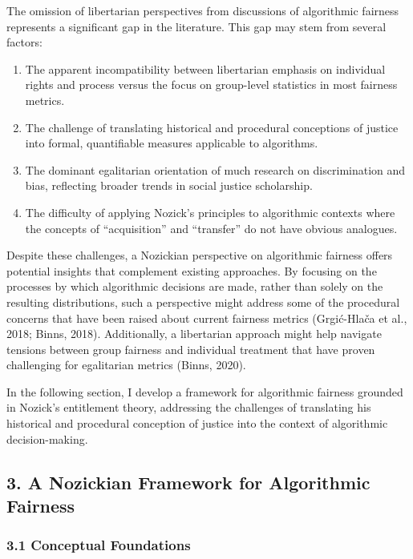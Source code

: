 The omission of libertarian perspectives from discussions of algorithmic
fairness represents a significant gap in the literature. This gap may
stem from several factors:

\begin{enumerate}
\def\labelenumi{\arabic{enumi}.}
\item
  The apparent incompatibility between libertarian emphasis on
  individual rights and process versus the focus on group-level
  statistics in most fairness metrics.
\item
  The challenge of translating historical and procedural conceptions of
  justice into formal, quantifiable measures applicable to algorithms.
\item
  The dominant egalitarian orientation of much research on
  discrimination and bias, reflecting broader trends in social justice
  scholarship.
\item
  The difficulty of applying Nozick's principles to algorithmic contexts
  where the concepts of ``acquisition'' and ``transfer'' do not have
  obvious analogues.
\end{enumerate}

Despite these challenges, a Nozickian perspective on algorithmic
fairness offers potential insights that complement existing approaches.
By focusing on the processes by which algorithmic decisions are made,
rather than solely on the resulting distributions, such a perspective
might address some of the procedural concerns that have been raised
about current fairness metrics (Grgić-Hlača et al., 2018; Binns, 2018).
Additionally, a libertarian approach might help navigate tensions
between group fairness and individual treatment that have proven
challenging for egalitarian metrics (Binns, 2020).

In the following section, I develop a framework for algorithmic fairness
grounded in Nozick's entitlement theory, addressing the challenges of
translating his historical and procedural conception of justice into the
context of algorithmic decision-making.

\subsection{3. A Nozickian Framework for Algorithmic
Fairness}\label{a-nozickian-framework-for-algorithmic-fairness}

\subsubsection{3.1 Conceptual Foundations}\label{conceptual-foundations}


